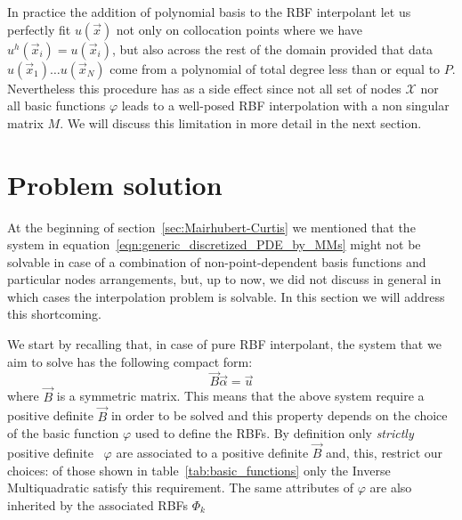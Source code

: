 In practice the addition of polynomial basis to the RBF interpolant let us perfectly fit $u(\vec{x})$ not only on collocation points where we have $u^h(\vec{x}_i)  = u(\vec{x}_i)$, but also across the rest of the domain provided that data $u(\vec{x}_1) \dots u(\vec{x}_N)$ come from a polynomial of total degree less than or equal to $P$.  Nevertheless this procedure has as a side effect since not all set of nodes $\mathcal{X}$ nor all basic functions $\varphi$ leads to a well-posed RBF interpolation with a non singular matrix $M$. We will discuss this limitation in more detail in the next section.



\section{Problem solution}
\label{sec:interpolation_prob_solution}

At the beginning of section~\ref{sec:Mairhubert-Curtis} we mentioned that the system in equation~\eqref{eqn:generic_discretized_PDE_by_MMs} might not be solvable in case of a combination of non-point-dependent basis functions and particular nodes arrangements, but, up to now, we did not discuss in general in which cases the interpolation problem is solvable. In this section we will address this shortcoming.

We start by recalling that, in case of pure RBF interpolant, the system that we aim to solve has the following compact form:
\begin{equation}
	\label{eqn:general_system_from_scattred_data_interpolation_compact_form}
	\vec{B} \vec{\alpha} = \vec{u}
\end{equation}
where $\vec{B}$ is a symmetric matrix.
This means that the above system require a positive definite $\vec{B}$ in order to be solved and this property depends on the choice of the basic function $\varphi$ used to define the RBFs. By definition only \emph{strictly} positive definite~\cite{Fasshauer:details_on_basic_functions} $\varphi$ are associated to a positive definite $\vec{B}$ and, this, restrict our choices: of those shown in table~\vref{tab:basic_functions} only the Inverse Multiquadratic satisfy this requirement. The same attributes of $\varphi$ are also inherited by the associated RBFs $\Phi_k$


